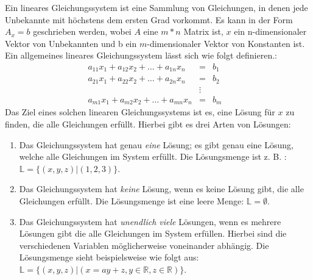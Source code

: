 \documentclass[a4paper, 12pt]{report}
\begin{document}
Ein lineares Gleichungssystem ist eine Sammlung von Gleichungen, in denen jede Unbekannte mit höchstens
dem ersten Grad vorkommt.
Es kann in der Form $ A_x = b $ geschrieben werden, wobei $A$ eine $ m*n $ Matrix ist,
$x$ ein n-dimensionaler Vektor von Unbekannten
und b ein $m$-dimensionaler Vektor von Konstanten ist.
Ein allgemeines lineares Gleichungssystem lässt sich wie folgt definieren.: \cite{1}
\begin{align}
    \label{eq:linGle}
    a_{11}x_{1}+ a_{12}x_{2}+\hdots+ a_{1n}x_{n} &=& b_1 &  \nonumber \\
    a_{21}x_{1}+ a_{22}x_{2}+\hdots+ a_{2n}x_{n} &=& b_2 &\nonumber\\
                                                 &\vdots &  \nonumber \\
    a_{m1}x_{1}+ a_{m2}x_2+\hdots+a_{mn}x_{n} &=& b_{m} &
\end{align}
Das Ziel eines solchen linearen Gleichungssystems ist es, eine Lösung für $x$ zu finden, die alle Gleichungen erfüllt.
Hierbei gibt es drei Arten von Lösungen:
\begin{enumerate}
    \item Das Gleichungssystem hat genau \textit{eine} Lösung;
        es gibt genau eine Lösung, welche alle Gleichungen im System
        erfüllt. Die Lösungsmenge ist z. B. : $\mathbb{L} = \{ (x,y,z)| (1,2,3)\} $.
    \item Das Gleichungssystem hat \textit{keine} Lösung, wenn es keine Lösung gibt,
        die alle Gleichungen erfüllt. Die Lösungsmenge ist eine leere Menge: $ \mathbb{L}= \emptyset$.
    \item Das Gleichungssystem hat \textit{unendlich viele} Lösungen, wenn es mehrere Lösungen gibt
        die alle Gleichungen im System erfüllen.
        Hierbei sind die verschiedenen Variablen möglicherweise voneinander abhängig.
        Die Lösungsmenge sieht beispielsweise wie folgt aus:
        \newline $ \mathbb{L} = \{(x, y, z)| (x = ay + z, y\in \mathbb{R}, z \in \mathbb{R}) \} $.
\end{enumerate}
\end{document}
